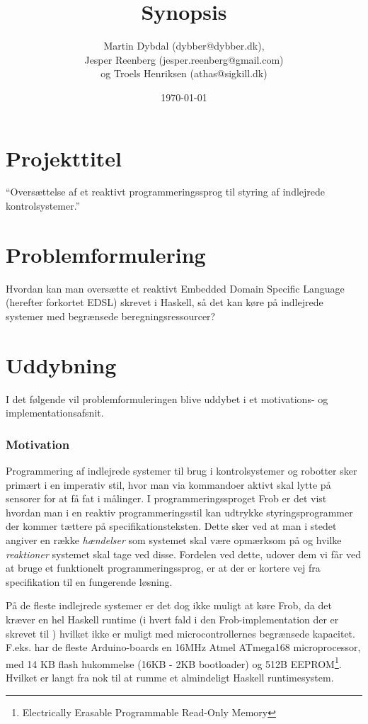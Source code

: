 \documentclass[a4paper,oneside, draft]{memoir}
\title{Synopsis}
\author{Martin Dybdal (dybber@dybber.dk), \\
Jesper Reenberg (jesper.reenberg@gmail.com) \\ og
Troels Henriksen (athas@sigkill.dk)}
\date{\today}
\newcommand{\EDSL}{Embedded Domain Specific Language (herefter forkortet
  EDSL) \renewcommand{\EDSL}{ EDSL }}
\begin{document}
\maketitle

\section{Projekttitel}
"`Oversættelse af et reaktivt programmeringssprog til styring af
indlejrede kontrolsystemer."'

\section{Problemformulering}
Hvordan kan man oversætte et reaktivt \EDSL skrevet i Haskell, så det
kan køre på indlejrede systemer med begrænsede beregningsressourcer?

\section{Uddybning}

I det følgende vil problemformuleringen blive uddybet i et motivations- og
implementationsafsnit.

\subsubsection{Motivation}
Programmering af indlejrede systemer til brug i kontrolsystemer og robotter sker
primært i en imperativ stil, hvor man via kommandoer aktivt skal lytte på
sensorer for at få fat i målinger. I programmeringssproget Frob\cite{frob99} er
det vist hvordan man i en reaktiv programmeringsstil kan udtrykke
styringsprogrammer der kommer tættere på specifikationsteksten. Dette sker ved
at man i stedet angiver en række \textit{hændelser} som systemet skal være
opmærksom på og hvilke \textit{reaktioner} systemet skal tage ved
disse. Fordelen ved dette, udover dem vi får ved at bruge et funktionelt
programmeringssprog, er at der er kortere vej fra specifikation til en
fungerende løsning.

På de fleste indlejrede systemer er det dog ikke muligt at køre Frob, da det
kræver en hel Haskell runtime (i hvert fald i den Frob-implementation der er
skrevet til \cite{frob99}) hvilket ikke er muligt med microcontrollernes
begrænsede kapacitet.  F.eks. har de fleste Arduino-boards \cite{arduino} en
16MHz Atmel ATmega168 microprocessor, med 14 KB flash hukommelse (16KB - 2KB
bootloader) og 512B EEPROM\footnote{Electrically Erasable Programmable Read-Only
  Memory}. Hvilket er langt fra nok til at rumme et almindeligt Haskell
runtimesystem.
\end{document}
